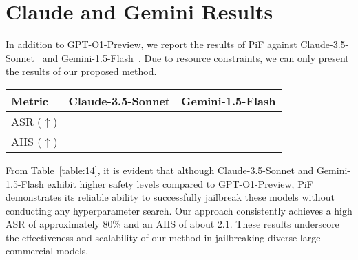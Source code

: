 \section{Claude and Gemini Results}
\label{appendix:F}

In addition to GPT-O1-Preview, we report the results of PiF against Claude-3.5-Sonnet~\citep{anthropic2024claude} and Gemini-1.5-Flash~\citep{team2023gemini}.
Due to resource constraints, we can only present the results of our proposed method.

\begin{table*}[h]
\setlength{\tabcolsep}{15pt} %

\caption{{The attack results of the PiF method targeting large commercial models on AdvBench.}} %
\label{table:14}
\centering
  \begin{tabular}{l | c | c }
    \toprule
    \toprule
    {Metric} & {Claude-3.5-Sonnet} & {Gemini-1.5-Flash} \\
    \midrule
     {ASR ($\uparrow$)} & \cellcolor{SelfColor!15}{79.42} & \cellcolor{SelfColor!15}{80.36}\\ 
    \midrule     
     {AHS ($\uparrow$)} & \cellcolor{SelfColor!15}{1.74} &  \cellcolor{SelfColor!15}{2.45} \\
    \bottomrule
    \bottomrule
  \end{tabular}
\end{table*}

From Table~\ref{table:14}, it is evident that although Claude-3.5-Sonnet and Gemini-1.5-Flash exhibit higher safety levels compared to GPT-O1-Preview, PiF demonstrates its reliable ability to successfully jailbreak these models without conducting any hyperparameter search. 
Our approach consistently achieves a high ASR of approximately 80\% and an AHS of about 2.1. 
These results underscore the effectiveness and scalability of our method in jailbreaking diverse large commercial models.